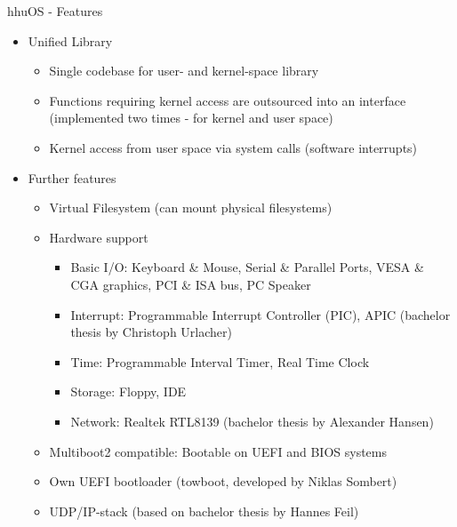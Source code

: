 	\begin{frame}{hhuOS - Features}
		\begin{itemize}
			\item Unified Library
			\begin{itemize}
				\item Single codebase for user- and kernel-space library
				\item Functions requiring kernel access are outsourced into an interface (implemented two times - for kernel and user space)
				\item Kernel access from user space via system calls (software interrupts)
			\end{itemize}
			\pause
			\item Further features
			\begin{itemize}
				\item Virtual Filesystem (can mount physical filesystems)
				\item Hardware support
					\begin{itemize}
						\item Basic I/O: Keyboard \& Mouse, Serial \& Parallel Ports, VESA \& CGA graphics, PCI \& ISA bus, PC Speaker
						\item Interrupt: Programmable Interrupt Controller (PIC), APIC (bachelor thesis by Christoph Urlacher)
						\item Time: Programmable Interval Timer, Real Time Clock
						\item Storage: Floppy, IDE
						\item Network: Realtek RTL8139 (bachelor thesis by Alexander Hansen)
					\end{itemize}
				\item Multiboot2 compatible: Bootable on UEFI and BIOS systems
				\item Own UEFI bootloader (towboot, developed by Niklas Sombert)
				\item UDP/IP-stack (based on bachelor thesis by Hannes Feil)
			\end{itemize}	
		\end{itemize}
	\end{frame}